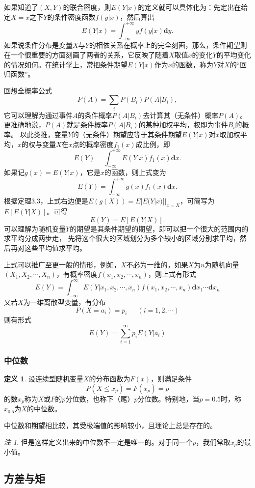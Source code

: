 \documentclass[a4paper,11pt]{article}%
\theoremstyle{remark}
\newtheorem*{remark}{注}
\theoremstyle{remark}
\theoremstyle{definition}
\theoremstyle{definition}
\newtheorem*{definition}{定义}
\theoremstyle{plain}
\begin{document}
如果知道了$(X,Y)$的联合密度，则$E(Y|x)$的定义就可以具体化为：先定出在给定$X=x$之下$Y$的条件密度函数$f(y|x)$，然后算出
\[E(Y|x)=\int_{-\infty}^{+\infty}yf(y|x)\mathbf{d}y.\]
如果说条件分布是变量$X$与$Y$的相依关系在概率上的完全刻画，那么，条件期望则在一个很重要的方面刻画了两者的关系，它反映了随着$X$取值$x$的变化$Y$的平均变化的情况如何。在统计学上，常把条件期望$E(Y|x)$作为$x$的函数，称为$Y$对$X$的“回归函数”。

回想全概率公式
 \[P(A)=\sum_i P(B_i)P(A|B_i),\]它可以理解为通过事件$A$的条件概率$P(A|B_i)$去计算其（无条件）概率$P(A)$。
更准确地说，$P(A)$就是条件概率$P(A|B_i)$的某种加权平均，权即为事件$B_i$的概率。 以此类推，变量$Y$的（无条件）期望应等于其条件期望$E(Y|x)$对$x$取加权平均，$x$的权与变量$X$在$x$点的概率密度$f_1(x)$成比例，即
\[E(Y)=\int_{-\infty}^{+\infty}E(Y|x)f_1(x)\mathbf{d}x.\]
如果记$g(x)=E(Y|x)$，它是$x$的函数，则上式变为
\[E(Y)=\int_{-\infty}^{+\infty}g(x)f_1(x)\mathbf{d}x.\]
根据定理3.3，上式右边便是$E(g(X))=E[E(Y|x)]|_{x=X}$，可简写为$E[E(Y|X)]$。可得
\[E(Y)=E[E(Y|X)].\]
可以理解为随机变量$Y$的期望是其条件期望的期望，即可以把一个很大的范围内的求平均分成两步走，
先将这个很大的区域划分为多个较小的区域分别求平均，然后再对这些平均值求平均。

上式可以推广至更一般的情形，例如，$X$不必为一维的，如果$X$为$n$为随机向量$(X_1,X_2,\cdots,X_n)$，有概率密度$f(x_1,x_2,\cdots,x_n)$，则上式有形式
\[E(Y)=\int_{-\infty}^{\infty}E(Y|x_1,x_2,\cdots,x_n)f(x_1,x_2,\cdots,x_n)\mathbf{d}x_1\cdots\mathbf{d}x_n\]
又若$X$为一维离散型变量，有分布
\[P(X=a_i)=p_i\phantom{222}(i=1,2,\cdots)\]
则有形式 
\[E(Y)=\sum_{i=1}^{\infty}p_iE(Y|a_i)\]
\subsubsection{中位数}
\begin{definition}
    设连续型随机变量$X$的分布函数为$F(x)$，则满足条件
    \[P(X\leq x_p)=F(x_p)=p\]
    的数$x_p$称为$X$或$F$的$p$分位数，也称下（尾）$p$分位数。特别地，当$p=0.5$时，称$x_{0.5}$为$X$的中位数。
\end{definition}
中位数和期望相比较，其受极端值的影响较小，且理论上总是存在的。
\begin{remark}
    但是这样定义出来的中位数不一定是唯一的。对于同一个$p$，我们常取$x_p$的最小值。
\end{remark}
\subsection{方差与矩}
\end{document}
